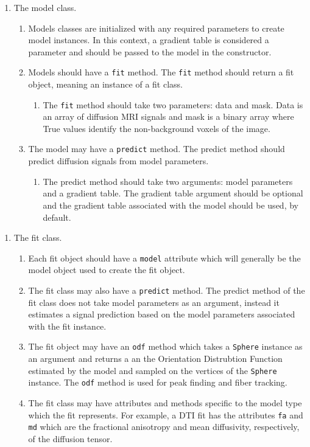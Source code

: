 \begin{enumerate}
\item The model class.
\begin{enumerate}
\item Models classes are initialized with any required parameters to create model instances. In this context, a gradient table is considered a parameter and should be passed to the model in the constructor.
\item Models should have a \verb|fit| method. The \verb|fit| method should return a fit object, meaning an instance of a fit class.
\begin{enumerate}
\item The \verb|fit| method should take two parameters: data and mask. Data is an array of diffusion MRI signals and mask is a binary array where True values identify the non-background voxels of the image.
\end{enumerate}
\item The model may have a \verb|predict| method. The predict method should predict diffusion signals from model parameters.
\begin{enumerate}
\item The predict method should take two arguments: model parameters and a gradient table. The gradient table argument should be optional and the gradient table associated with the model should be used, by default.
\end{enumerate}
\end{enumerate}
\end{enumerate}
\begin{enumerate}
    \item The fit class.
    \begin{enumerate}
        \item Each fit object should have a \verb|model| attribute which will generally be the model object used to create the fit object.
        \item The fit class may also have a \verb|predict| method. The predict method of the fit class does not take model parameters as an argument, instead it estimates a signal prediction based on the model parameters associated with the fit instance.
        \item The fit object may have an \verb|odf| method which takes a \verb|Sphere| instance as an argument and returns a an the Orientation Distrubtion Function estimated by the model and sampled on the vertices of the \verb|Sphere| instance. The \verb|odf| method is used for peak finding and fiber tracking.
        \item The fit class may have attributes and methods specific to the model type which the fit represents. For example, a DTI fit has the attributes \verb|fa| and \verb|md| which are the fractional anisotropy and mean diffusivity, respectively, of the diffusion tensor.
    \end{enumerate}
\end{enumerate}

